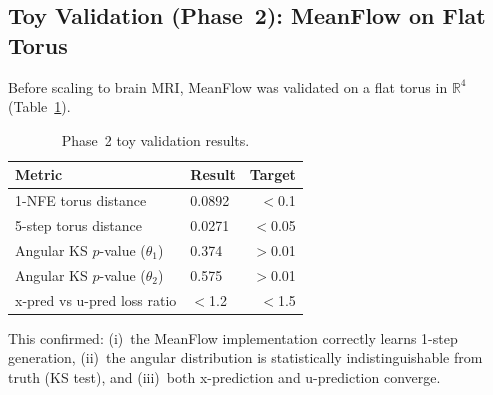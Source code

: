 \subsection{Toy Validation (Phase~2): MeanFlow on Flat Torus}

Before scaling to brain MRI, MeanFlow was validated on a flat torus in
$\mathbb{R}^4$ (Table~\ref{tab:torus}).

\begin{table}[ht]
\centering
\caption{Phase~2 toy validation results.}
\label{tab:torus}
\begin{tabular}{llr}
\toprule
\textbf{Metric} & \textbf{Result} & \textbf{Target} \\
\midrule
1-NFE torus distance            & 0.0892  & $<$0.1 \\
5-step torus distance           & 0.0271  & $<$0.05 \\
Angular KS $p$-value ($\theta_1$) & 0.374 & $>$0.01 \\
Angular KS $p$-value ($\theta_2$) & 0.575 & $>$0.01 \\
x-pred vs u-pred loss ratio     & $<$1.2  & $<$1.5 \\
\bottomrule
\end{tabular}
\end{table}

This confirmed: (i)~the MeanFlow implementation correctly learns 1-step
generation, (ii)~the angular distribution is statistically indistinguishable
from truth (KS test), and (iii)~both x-prediction and u-prediction converge.
